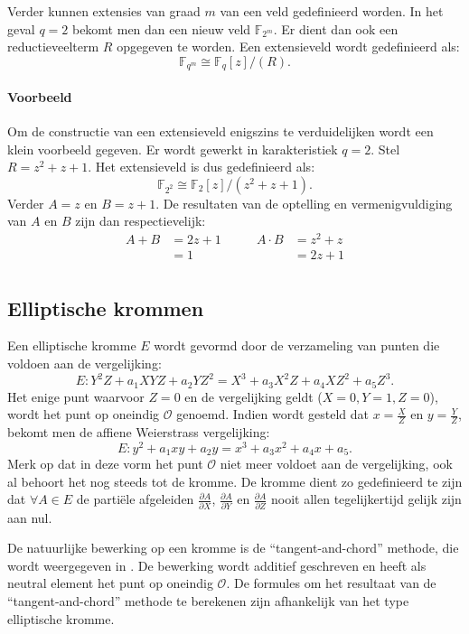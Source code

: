 Verder kunnen extensies van graad $m$ van een veld gedefinieerd worden. In het geval $q = 2$ bekomt men dan een nieuw veld $\mathbb{F}_{2^m}$. Er dient dan ook een reductieveelterm $R$ opgegeven te worden. Een extensieveld wordt gedefinieerd als:
\[\mathbb{F}_{q^m} \cong \mathbb{F}_q [z] / (R). \]

\paragraph{Voorbeeld} Om de constructie van een extensieveld enigszins te verduidelijken wordt een klein voorbeeld gegeven. Er wordt gewerkt in karakteristiek $q = 2$. Stel $R = z^2 + z + 1$. Het extensieveld is dus gedefinieerd als:
\[\mathbb{F}_{2^2} \cong \mathbb{F}_2 [z] / (z^2 + z + 1). \]
Verder $A = z$ en $B = z + 1$. De resultaten van de optelling en vermenigvuldiging van $A$ en $B$ zijn dan respectievelijk:
\[\begin{aligned}
A + B &= 2z + 1 \qquad & A \cdot B &= z^2 + z\\
&= 1	& &= 2z + 1\\
\end{aligned}\]

\subsection{Elliptische krommen}

Een elliptische kromme $E$ wordt gevormd door de verzameling van punten die voldoen aan de vergelijking:
\[E: Y^2 Z + a_1 XYZ + a_2 Y Z^2 = X^3 + a_3 X^2 Z + a_4 X Z^2 + a_5 Z^3.\]
Het enige punt waarvoor $Z = 0$ en de vergelijking geldt ($X = 0,  Y = 1, Z = 0$), wordt het punt op oneindig $\mathcal{O}$ genoemd. Indien wordt gesteld dat $x = \frac{X}{Z}$ en $y = \frac{Y}{Z}$, bekomt men de affiene Weierstrass vergelijking:
\[E: y^2 + a_1 xy + a_2 y = x^3 + a_3 x^2 + a_4 x + a_5.\]
Merk op dat in deze vorm het punt $\mathcal{O}$ niet meer voldoet aan de vergelijking, ook al behoort het nog steeds tot de kromme. De kromme dient zo gedefinieerd te zijn dat $\forall A \in E$ de parti\"ele afgeleiden $\frac{\partial A}{\partial X}$, $\frac{\partial A}{\partial Y}$ en $\frac{\partial A}{\partial Z}$ nooit allen tegelijkertijd gelijk zijn aan nul.

De natuurlijke bewerking op een kromme is de ``tangent-and-chord'' methode, die wordt weergegeven in . De bewerking wordt additief geschreven en heeft als neutral element het punt op oneindig $\mathcal{O}$. De formules om het resultaat van de ``tangent-and-chord'' methode te berekenen zijn afhankelijk van het type elliptische kromme.

